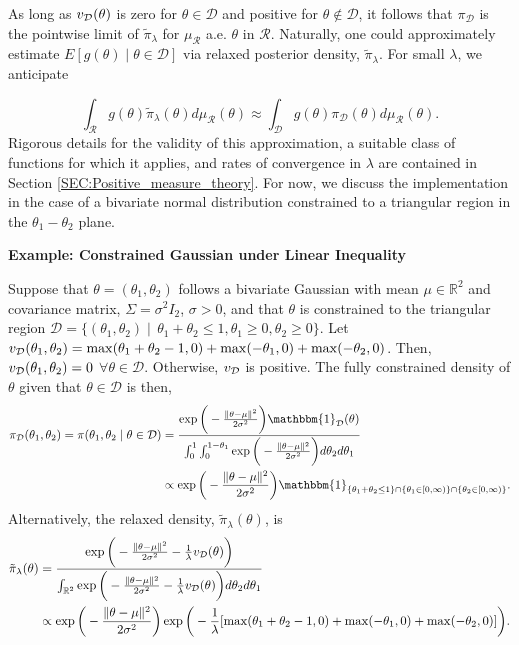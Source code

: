 \documentclass[10pt,fleqn]{article} \pdfoutput=1
\DeclareMathOperator{\1}{\mathbbm{1}} \DeclareMathOperator{\bigO}{\mc O}
\begin{document}
As long as $v_{\mathcal{D}}(\theta)$ is zero for $\theta \in \mathcal{D}$ and positive
for $\theta\not\in\mathcal{D}$, it follows that $\pi_\mathcal{D}$ is the
pointwise limit of $\tilde{\pi}_\lambda$ for $\mu_\mathcal{R}$ a.e.
$\theta$ in $\mathcal{R}.$  Naturally, one could approximately estimate
$E[g(\theta) \mid \theta\in\mathcal{D}]$ via relaxed
posterior density, $\tilde{\pi}_\lambda$. For small $\lambda$, we anticipate

$$\int_\mathcal{R} g(\theta)\tilde{\pi}_\lambda(\theta)
	d\mu_\mathcal{R}(\theta) \approx \int_\mathcal{D}
	g(\theta)\pi_\mathcal{D}(\theta) d\mu_\mathcal{R}(\theta) .$$
Rigorous
details for the validity of this approximation, a suitable class of
functions for which it applies, and rates of convergence in $\lambda$ are
contained in Section \ref{SEC:Positive_measure_theory}. For now, we discuss
the implementation in the case of a bivariate normal distribution
constrained to a triangular region in the $\theta_1-\theta_2$ plane.

\textbf{Example: Constrained Gaussian  under Linear Inequality}

Suppose that $\theta = (\theta_1,\theta_2)$ follows a bivariate Gaussian
with mean $\mu \in\mathbb{R}^2$ and covariance matrix, $\Sigma = \sigma^2
	I_2$, $\sigma > 0$, and that $\theta$  is constrained to the triangular
region $\mathcal{D} = \{(\theta_1,\theta_2) \mid  \, \theta_1+\theta_2\le 1,
	\theta_1\ge0, \theta_2 \ge 0\}.$ Let $v_{\mathcal{D}}(\theta_1,\theta_2) =
	\max(\theta_1+\theta_2 -1,0) + \max(-\theta_1,0) + \max(-\theta_2,0)$.
Then, $v_{\mathcal{D}}(\theta_1,\theta_2) = 0$ $\forall \theta\in\mathcal{D}$.
Otherwise, $v_{\mathcal{D}}$ is positive.  The fully constrained density of $\theta$
given that $\theta\in \mathcal{D}$ is then, \begin{align*}
	\pi_\mathcal{D}(\theta_1,\theta_2)=
	\pi(\theta_1,\theta_2\mid \theta\in\mathcal{D}) & =
	\frac{\exp\bigg(-\frac{\|\theta-\mu\|^2}{2\sigma^2}\bigg)\mathbbm{1}_\mathcal{D}(\theta)}{\int_0^1\int_0^{1-\theta_1}\exp\bigg(-\frac{\|\theta-\mu\|^2}{2\sigma^2}\bigg)d\theta_2d\theta_1} \\
	                                            & \propto \exp\bigg(-\frac{\|\theta-\mu\|^2}{2\sigma^2}\bigg)
	\mathbbm{1}_{\{\theta_1+\theta_2\le 1\}\cap \{\theta_1 \in
	[0,\infty)\}\cap \{\theta_2\in[0,\infty)\}} .\end{align*}
Alternatively, the relaxed density, $\tilde{\pi}_\lambda(\theta)$,
is \begin{equation} \begin{split} \tilde{\pi}_\lambda(\theta)
		&=\frac{\exp\bigg(-\frac{\|\theta-\mu\|^2}{2\sigma^2} -
			\frac{1}{\lambda}v_{\mathcal{D}}(\theta) \bigg)}{\int_{\mathbb{R}^2}
			\exp\bigg(-\frac{\|\theta-\mu\|^2}{2\sigma^2}-\frac{1}{\lambda}v_{\mathcal{D}}(\theta)
			\bigg)d\theta_2d\theta_1}\\ & \propto
		\exp\bigg(-\frac{\|\theta-\mu\|^2}{2\sigma^2}\bigg)\exp\bigg( -
		\frac{1}{\lambda}[\max(\theta_1+\theta_2 -1,0) + \max(-\theta_1,0) +
				\max(-\theta_2,0)] \bigg).  \end{split}
	\label{EQ:Relaxed_Density_Bivariate_Normal_Triangle} \end{equation}
\end{document}
